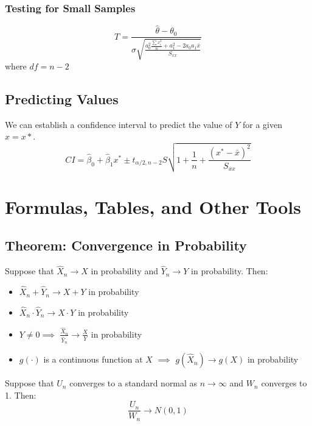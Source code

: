 \documentclass[sn-mathphys,Numbered]{sn-jnl}%
\begin{document}
\subsubsection{Testing for Small Samples}
\begin{equation}
    T = \frac{\hat \theta - \theta_0}
    {\sigma \sqrt{\frac{a_0^2{\frac{\sum x_i^2}{n}} + a_1^2 - 2a_0a_1 \bar x}{S_{xx}}}}
\end{equation}
where $df = n-2$
\subsection{Predicting Values}
We can establish a confidence interval to predict the value of $Y$ for a given
$x = x*$.
\begin{equation}
    CI = \hat \beta_0 + \hat \beta_1 x^* \pm t_{\alpha/2, n-2} S \sqrt{1 + \frac{1}{n} + \frac{{(x^* - \bar x)}^2}{S_{xx}}}
\end{equation}

\newpage
\section*{Formulas, Tables, and Other Tools}\label{formulas-and-tables}
\subsection*{Theorem: Convergence in Probability}
Suppose that $\hat X_n \to X$ in probability and $\hat Y_n \to Y$ in
probability. Then:
\begin{itemize}
    \item $\hat X_n + \hat Y_n \to X + Y$ in probability
    \item $\hat X_n \cdot \hat Y_n \to X \cdot Y$ in probability
    \item $Y \ne 0 \implies $ $\frac{\hat X_n}{\hat Y_n} \to \frac{X}{Y}$ in probability
    \item $g(\cdot)$ is a continuous function at $X$ $\implies$ $g(\hat X_n) \to g(X)$ in
          probability
\end{itemize}
Suppose that $U_n$ converges to a standard normal as $n \to \infty$ and $W_n$ converges to 1. Then:
\begin{equation}
    \frac{U_n}{W_n} \to N(0, 1)
\end{equation}
\end{document}
